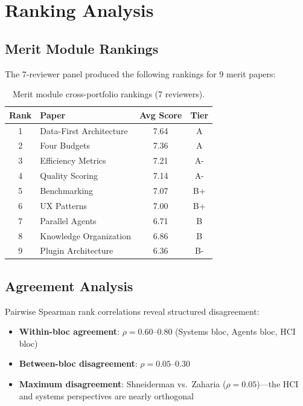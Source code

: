\section{Ranking Analysis}

\subsection{Merit Module Rankings}

The 7-reviewer panel produced the following rankings for 9 merit papers:

\begin{table}[h]
\centering
\small
\begin{tabular}{clcc}
\toprule
Rank & Paper & Avg Score & Tier \\
\midrule
1 & Data-First Architecture & 7.64 & A \\
2 & Four Budgets & 7.36 & A \\
3 & Efficiency Metrics & 7.21 & A- \\
4 & Quality Scoring & 7.14 & A- \\
5 & Benchmarking & 7.07 & B+ \\
6 & UX Patterns & 7.00 & B+ \\
7 & Parallel Agents & 6.71 & B \\
8 & Knowledge Organization & 6.86 & B \\
9 & Plugin Architecture & 6.36 & B- \\
\bottomrule
\end{tabular}
\caption{Merit module cross-portfolio rankings (7 reviewers).}
\end{table}

\subsection{Agreement Analysis}

Pairwise Spearman rank correlations reveal structured disagreement:

\begin{itemize}
    \item \textbf{Within-bloc agreement}: $\rho = 0.60$--$0.80$ (Systems bloc, Agents bloc, HCI bloc)
    \item \textbf{Between-bloc disagreement}: $\rho = 0.05$--$0.30$
    \item \textbf{Maximum disagreement}: Shneiderman vs.\ Zaharia ($\rho = 0.05$)---the HCI and systems perspectives are nearly orthogonal
\end{itemize}

